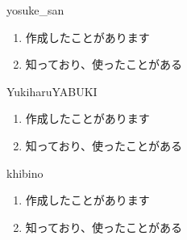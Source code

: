 \begin{prework}{ yosuke\_san }
  \begin{enumerate}
  \item 作成したことがあります
  \item 知っており、使ったことがある
  \end{enumerate}
\end{prework}

\begin{prework}{ YukiharuYABUKI }
  \begin{enumerate}
  \item 作成したことがあります
  \item 知っており、使ったことがある
  \end{enumerate}
\end{prework}

\begin{prework}{ khibino }
  \begin{enumerate}
  \item 作成したことがあります
  \item 知っており、使ったことがある
  \end{enumerate}
\end{prework}
